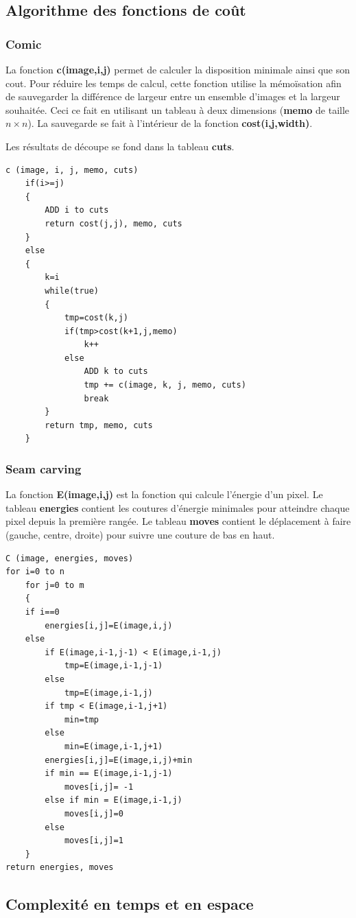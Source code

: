 \documentclass[10pt]{article}
\begin{document}
\subsection{Algorithme des fonctions de coût}
\subsubsection{Comic}La fonction \textbf{ c(image,i,j)} permet de calculer la disposition minimale ainsi que son cout. Pour réduire les temps de calcul, cette fonction utilise la mémoïsation afin de sauvegarder la différence de largeur entre un ensemble d'images et la largeur souhaitée. Ceci ce fait en utilisant un tableau à deux dimensions (\textbf{memo} de taille $n \times n$). La sauvegarde se fait à l'intérieur de la fonction \textbf{cost(i,j,width)}.

Les résultats de découpe se fond dans la tableau \textbf{cuts}.
\begin{lstlisting}[frame=single]
c (image, i, j, memo, cuts)
	if(i>=j)
	{
		ADD i to cuts
		return cost(j,j), memo, cuts 
	}
	else
	{
		k=i
		while(true)
		{
			tmp=cost(k,j)
			if(tmp>cost(k+1,j,memo)
				k++
			else
				ADD k to cuts
				tmp += c(image, k, j, memo, cuts)
				break
		}
		return tmp, memo, cuts
	}
\end{lstlisting}
\subsubsection{Seam carving} \label{sssec:num1}
La fonction\textbf{ E(image,i,j)} est la fonction qui calcule l'énergie d'un pixel. Le tableau \textbf{energies} contient les coutures d'énergie minimales pour atteindre chaque pixel depuis la première rangée. Le tableau \textbf{moves} contient le déplacement à faire (gauche, centre, droite) pour suivre une couture de bas en haut. 
\begin{lstlisting}[frame=single]
C (image, energies, moves)
for i=0 to n
	for j=0 to m
	{
	if i==0
		energies[i,j]=E(image,i,j)
	else
		if E(image,i-1,j-1) < E(image,i-1,j)
			tmp=E(image,i-1,j-1)
		else
			tmp=E(image,i-1,j)
		if tmp < E(image,i-1,j+1)
			min=tmp
		else
			min=E(image,i-1,j+1)
		energies[i,j]=E(image,i,j)+min
		if min == E(image,i-1,j-1)			
			moves[i,j]= -1
		else if min = E(image,i-1,j)
			moves[i,j]=0
		else
			moves[i,j]=1
	}
return energies, moves
\end{lstlisting}

\subsection{Complexité en temps et en espace}
\end{document}
